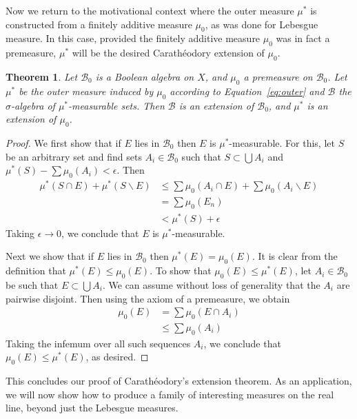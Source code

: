 \documentclass[11pt,oneside]{amsbook}
\renewcommand{\setminus}{\smallsetminus}
\theoremstyle{definition}
\theoremstyle{plain}
\newtheorem{thm}{Theorem}[section]
\theoremstyle{definition}
\theoremstyle{remark}
\numberwithin{equation}{section}
\numberwithin{figure}{section}
\begin{document}
Now we return to the motivational context where the outer measure $\mu^*$ is constructed from a finitely additive measure $\mu_0$, as was done for Lebesgue measure. In this case, provided the finitely additive measure $\mu_0$ was in fact a premeasure, $\mu^*$ will be the desired Carath\'eodory extension of $\mu_0$.

\begin{thm}
  Let $\mathcal B_0$ is a Boolean algebra on $X$, and $\mu_0$ a premeasure on $\mathcal B_0$. Let $\mu^*$ be the outer measure induced by $\mu_0$ according to Equation~\eqref{eq:outer} and $\mathcal B$ the $\sigma$-algebra of $\mu^*$-measurable sets. Then $\mathcal B$ is an extension of $\mathcal B_0$, and $\mu^*$ is an extension of $\mu_0$.
\end{thm}

\begin{proof}
  We first show that if  $E$ lies in $\mathcal B_0$ then $E$ is $\mu^*$-measurable. For this, let $S$ be an arbitrary set and find sets $A_i\in\mathcal B_0$ such that $S\subset\bigcup A_i$ and $\mu^*(S)-\sum\mu_0(A_i)<\epsilon$. Then
  \begin{align*}
    \mu^*(S\cap E)+\mu^*(S\setminus E)&\leq\sum\mu_0(A_i\cap E)
                                        +\sum\mu_0(A_i\setminus E)\\
                                      &=\sum\mu_0(E_n)\\
                                      &<\mu^*(S)+\epsilon
  \end{align*}
  Taking $\epsilon\to0$, we conclude that $E$ is $\mu^*$-measurable.

  Next we show that if $E$ lies in $\mathcal B_0$ then $\mu^*(E)=\mu_0(E)$. It is clear from the definition that $\mu^*(E)\leq\mu_0(E)$. To show that $\mu_0(E)\leq\mu^*(E)$, let $A_i\in\mathcal B_0$ be such that $E\subset\bigcup A_i$. We can assume without loss of generality that the $A_i$ are pairwise disjoint. Then using the axiom of a premeasure, we obtain
  \begin{align*}
    \mu_0(E)&=\sum\mu_0(E\cap A_i)\\
            &\leq\sum\mu_0(A_i)
  \end{align*}
  Taking the infemum over all such sequences $A_i$, we conclude that $\mu_0(E)\leq\mu^*(E)$, as desired.
\end{proof}

This concludes our proof of Carath\'eodory's extension theorem. As an application, we will now show how to produce a family of interesting measures on the real line, beyond just the Lebesgue measures.
\end{document}
